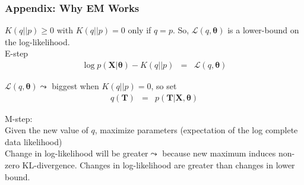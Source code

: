 \documentclass{beamer}
\numberwithin{equation}{section}
\begin{document}
\begin{frame}
\frametitle{Appendix: Why EM Works}

$K(q||p)\geq0$ with $K(q||p) = 0$ only if $q = p$.  So, $\mathcal{L}(q, \boldsymbol{\theta})$ is a lower-bound on the log-likelihood.  \\
E-step
\begin{eqnarray}
\log p(\boldsymbol{X}|\boldsymbol{\theta}) - K(q||p) & = & \mathcal{L}(q, \boldsymbol{\theta}) \nonumber 
\end{eqnarray}

$\mathcal{L}(q, \boldsymbol{\theta})\leadsto$ biggest when $K(q||p) = 0$, so set 
\begin{eqnarray}
q(\boldsymbol{T}) & = & p(\boldsymbol{T}| \boldsymbol{X}, \boldsymbol{\theta}) \nonumber 
\end{eqnarray}


M-step:\\
Given the new value of $q$, maximize parameters (expectation of the log complete data likelihood)\\
Change in log-likelihood will be greater$\leadsto$ because new maximum induces non-zero KL-divergence.  Changes in log-likelihood are greater than changes in lower bound.  


\end{frame}
\end{document}
